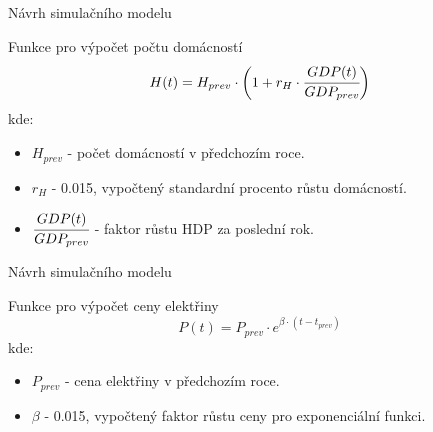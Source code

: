 \documentclass{beamer}
\begin{document}
\begin{frame}{Návrh simulačního modelu}
    \begin{block}{Funkce pro výpočet počtu domácností}
    \[H(t) = H_{prev} \cdot \bigg(1 + r_{H} \cdot \cfrac{GDP(t)}{GDP_{prev}}\bigg)\]
    kde:
    \begin{itemize}
        \item $H_{prev}$ - počet domácností v předchozím roce.
        \item $r_{H}$ - 0.015, vypočtený standardní procento růstu domácností.
        \item $\cfrac{GDP(t)}{GDP_{prev}}$ - faktor růstu HDP za poslední rok.
    \end{itemize}
    \end{block}
\end{frame}

\begin{frame}{Návrh simulačního modelu}
    \begin{block}{Funkce pro výpočet ceny elektřiny}
    \[P(t) = P_{prev} \cdot e^{\beta \cdot (t-t_{prev})}\]
    kde:
    \begin{itemize}
        \item $P_{prev}$ - cena elektřiny v předchozím roce.
        \item $\beta$ - 0.015, vypočtený faktor růstu ceny pro exponenciální funkci.
    \end{itemize}
    \end{block}
        
\end{frame}
\end{document}
